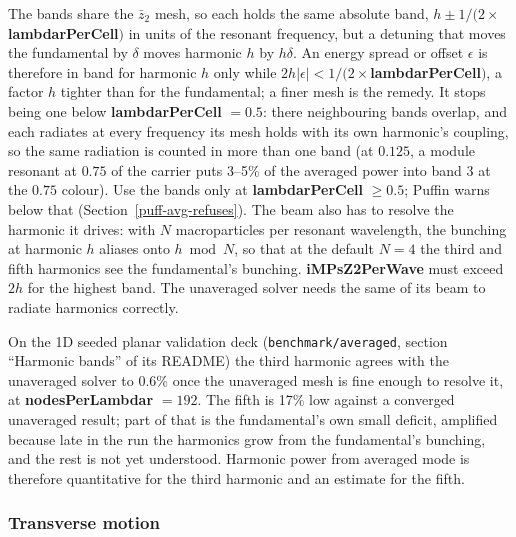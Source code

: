 \documentclass[12pt]{article}%
\begin{document}
The bands share the $\bar{z}_2$ mesh, so each holds the same absolute band, $h \pm 1/(2\times${\bf lambdarPerCell}$)$ in units of the resonant frequency, but a detuning that moves the fundamental by $\delta$ moves harmonic $h$ by $h\delta$. An energy spread or offset $\epsilon$ is therefore in band for harmonic $h$ only while $2h|\epsilon| < 1/(2\times${\bf lambdarPerCell}$)$, a factor $h$ tighter than for the fundamental; a finer mesh is the remedy. It stops being one below {\bf lambdarPerCell} $= 0.5$: there neighbouring bands overlap, and each radiates at every frequency its mesh holds with its own harmonic's coupling, so the same radiation is counted in more than one band (at $0.125$, a module resonant at $0.75$ of the carrier puts 3--5\% of the averaged power into band 3 at the $0.75$ colour). Use the bands only at {\bf lambdarPerCell} $\ge 0.5$; Puffin warns below that (Section~\ref{puff-avg-refuses}). The beam also has to resolve the harmonic it drives: with $N$ macroparticles per resonant wavelength, the bunching at harmonic $h$ aliases onto $h \bmod N$, so that at the default $N = 4$ the third and fifth harmonics see the fundamental's bunching. {\bf iMPsZ2PerWave} must exceed $2h$ for the highest band. The unaveraged solver needs the same of its beam to radiate harmonics correctly.

On the 1D seeded planar validation deck ({\tt benchmark/averaged}, section ``Harmonic bands'' of its README) the third harmonic agrees with the unaveraged solver to 0.6\% once the unaveraged mesh is fine enough to resolve it, at {\bf nodesPerLambdar} $= 192$. The fifth is 17\% low against a converged unaveraged result; part of that is the fundamental's own small deficit, amplified because late in the run the harmonics grow from the fundamental's bunching, and the rest is not yet understood. Harmonic power from averaged mode is therefore quantitative for the third harmonic and an estimate for the fifth.

\subsubsection{Transverse motion}
\end{document}
